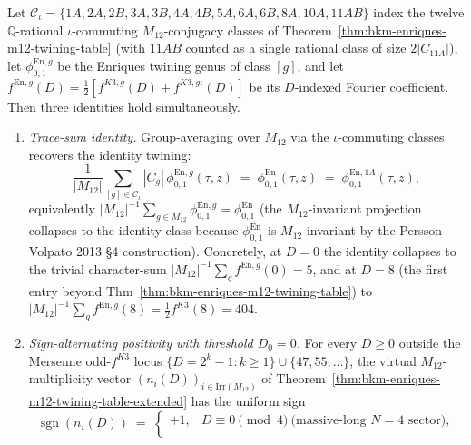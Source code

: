 \begin{theorem}
\label{thm:bkm-enriques-m12-mass-formula}
Let $\mathcal{C}_\iota = \{1A, 2A, 2B, 3A, 3B, 4A, 4B, 5A, 6A, 6B, 8A, 10A, 11AB\}$
index the twelve $\mathbb{Q}$-rational $\iota$-commuting $M_{12}$-conjugacy
classes of Theorem~\ref{thm:bkm-enriques-m12-twining-table} (with $11AB$
counted as a single rational class of size $2|C_{11A}|$), let $\phi^{\mathrm{En},g}_{0,1}$
be the Enriques twining genus of class $[g]$, and let $f^{\mathrm{En},g}(D) =
\tfrac{1}{2}[f^{K3,g}(D) + f^{K3, g\iota}(D)]$ be its $D$-indexed Fourier
coefficient. Then three identities hold simultaneously.
\begin{enumerate}[label=\textup{(\alph*)}]
\item \emph{Trace-sum identity.} Group-averaging over $M_{12}$ via the
$\iota$-commuting classes recovers the identity twining:
\begin{equation}
\label{eq:mass-trace-sum}
 \frac{1}{|M_{12}|}\sum_{[g]\in\mathcal{C}_\iota}|C_g|\,
 \phi^{\mathrm{En},g}_{0,1}(\tau, z)
 \;=\;
 \phi^{\mathrm{En}}_{0,1}(\tau, z)\;=\;\phi^{\mathrm{En},1A}_{0,1}(\tau, z),
\end{equation}
equivalently $|M_{12}|^{-1}\sum_{g\in M_{12}}\phi^{\mathrm{En},g}_{0,1} =
\phi^{\mathrm{En}}_{0,1}$ (the $M_{12}$-invariant projection collapses to the
identity class because $\phi^{\mathrm{En}}_{0,1}$ is $M_{12}$-invariant by the
Persson--Volpato 2013 \S 4 construction). Concretely, at $D = 0$ the identity
collapses to the trivial character-sum
$|M_{12}|^{-1}\sum_g f^{\mathrm{En},g}(0) = 5$, and at $D = 8$ (the first
entry beyond Thm~\ref{thm:bkm-enriques-m12-twining-table}) to
$|M_{12}|^{-1}\sum_g f^{\mathrm{En},g}(8) = \tfrac{1}{2}f^{K3}(8) = 404$.
\item \emph{Sign-alternating positivity with threshold $D_0 = 0$.}
For every $D\geq 0$ outside the Mersenne odd-$f^{K3}$ locus
$\{D = 2^k - 1 : k\geq 1\}\cup\{47, 55, \ldots\}$, the virtual
$M_{12}$-multiplicity vector $(n_i(D))_{i\in\mathrm{Irr}(M_{12})}$ of
Theorem~\ref{thm:bkm-enriques-m12-twining-table-extended} has the uniform
sign
\begin{equation}
\label{eq:mass-positivity}
 \operatorname{sgn}(n_i(D)) \;=\;
 \begin{cases}
 +1, & D\equiv 0\pmod 4\ \text{(massive-long $N=4$ sector)},\\

\end{cases}
\end{equation}
\end{enumerate}
\end{theorem}
